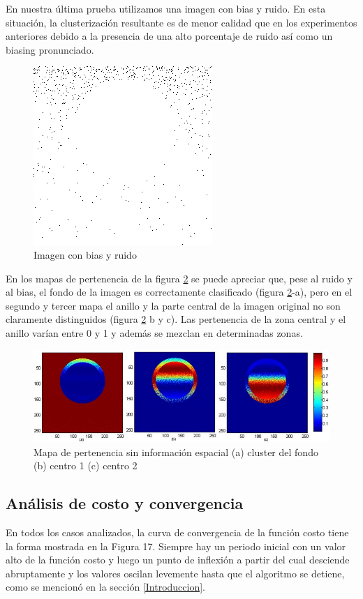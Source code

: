 En nuestra última prueba utilizamos una imagen con bias y ruido. En esta situación, la clusterización resultante es de menor calidad que en los experimentos anteriores debido a la presencia de una alto porcentaje de ruido así como un biasing pronunciado. 

\begin{figure}[H]
\centering
\includegraphics[scale=0.3]{images/biasing_con_ruido.png}
\caption{Imagen con bias y ruido}
\label{fig:circulo_bias_ruido}
\end{figure}

En los mapas de pertenencia de la figura \ref{fig:circulo_bias_ruido_cluster} se puede apreciar que, pese al ruido y al bias, el fondo de la imagen es correctamente clasificado (figura \ref{fig:circulo_bias_ruido_cluster}-a), pero en el segundo y tercer mapa el anillo y la parte central de la imagen original no son claramente distinguidos (figura \ref{fig:circulo_bias_ruido_cluster} b y c). Las pertenencia de la zona central y el anillo varían entre 0 y 1 y además se mezclan en determinadas zonas.

\begin{figure}[H]
\centering
\includegraphics[scale=0.3]{images/bias_sin_coord_con_ruido.jpg}
\caption{Mapa de pertenencia sin información espacial (a) cluster del  fondo (b) centro 1 (c) centro 2}
\label{fig:circulo_bias_ruido_cluster}
\end{figure}

\subsection{Análisis de costo y convergencia}
En todos los casos analizados, la curva de convergencia de la función costo tiene la forma mostrada en la Figura 17. Siempre hay un periodo inicial con un valor alto de la función costo y luego un punto de inflexión a partir del cual desciende abruptamente y los valores oscilan levemente hasta que el algoritmo se detiene, como se mencionó en la sección \ref{Introduccion}.

